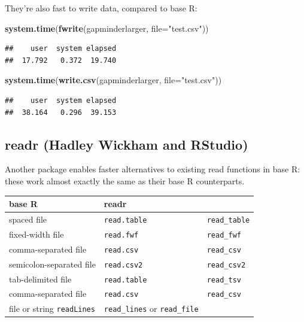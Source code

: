 \documentclass[]{article}
\newenvironment{Shaded}{\begin{snugshade}}{\end{snugshade}}
\newcommand{\KeywordTok}[1]{\textcolor[rgb]{0.13,0.29,0.53}{\textbf{{#1}}}}
\newcommand{\DataTypeTok}[1]{\textcolor[rgb]{0.13,0.29,0.53}{{#1}}}
\newcommand{\StringTok}[1]{\textcolor[rgb]{0.31,0.60,0.02}{{#1}}}
\newcommand{\NormalTok}[1]{{#1}}
\begin{document}
They're also fast to write data, compared to base R:

\begin{Shaded}
\begin{Highlighting}[]
\KeywordTok{system.time}\NormalTok{(}\KeywordTok{fwrite}\NormalTok{(gapminderlarger, }\DataTypeTok{file=}\StringTok{"test.csv"}\NormalTok{))}
\end{Highlighting}
\end{Shaded}

\begin{verbatim}
##    user  system elapsed 
##  17.792   0.372  19.740
\end{verbatim}

\begin{Shaded}
\begin{Highlighting}[]
\KeywordTok{system.time}\NormalTok{(}\KeywordTok{write.csv}\NormalTok{(gapminderlarger, }\DataTypeTok{file=}\StringTok{"test.csv"}\NormalTok{))}
\end{Highlighting}
\end{Shaded}

\begin{verbatim}
##    user  system elapsed 
##  38.164   0.296  39.153
\end{verbatim}

\subsection{readr (Hadley Wickham and
RStudio)}\label{readr-hadley-wickham-and-rstudio}

Another package enables faster alternatives to existing read functions
in base R: these work almost exactly the same as their base R
counterparts.

\begin{longtable}[c]{@{}lll@{}}
\toprule
\textbf{base R} & \textbf{readr}\tabularnewline
\midrule
\endhead
spaced file & \texttt{read.table} & \texttt{read\_table}\tabularnewline
fixed-width file & \texttt{read.fwf} & \texttt{read\_fwf}\tabularnewline
comma-separated file & \texttt{read.csv} &
\texttt{read\_csv}\tabularnewline
semicolon-separated file & \texttt{read.csv2} &
\texttt{read\_csv2}\tabularnewline
tab-delimited file & \texttt{read.table} &
\texttt{read\_tsv}\tabularnewline
comma-separated file & \texttt{read.csv} &
\texttt{read\_csv}\tabularnewline
file or string \texttt{readLines} & \texttt{read\_lines} or
\texttt{read\_file}\tabularnewline
\bottomrule
\end{longtable}
\end{document}
